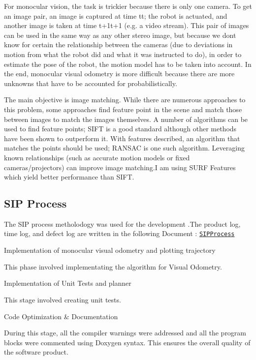 For monocular vision, the task is trickier because there is only one camera. To get an image pair, an image is captured at time tt; the robot is actuated, and another image is taken at time t+1t+1 (e.\+g. a video stream). This pair of images can be used in the same way as any other stereo image, but because we don\textquotesingle{}t know for certain the relationship between the cameras (due to deviations in motion from what the robot did and what it was instructed to do), in order to estimate the pose of the robot, the motion model has to be taken into account. In the end, monocular visual odometry is more difficult because there are more unknowns that have to be accounted for probabilistically.

The main objective is image matching. While there are numerous approaches to this problem, some approaches find feature point in the scene and match those between images to match the images themselves. A number of algorithms can be used to find feature points; S\+I\+FT is a good standard although other methods have been shown to outperform it. With features described, an algorithm that matches the points should be used; R\+A\+N\+S\+AC is one such algorithm. Leveraging known relationships (such as accurate motion models or fixed cameras/projectors) can improve image matching.\+I am using S\+U\+RF Features which yield better performance than S\+I\+FT.

\subsection*{S\+IP Process}

The S\+IP process metholodogy was used for the development .The product log, time log, and defect log are written in the following Document \+: \href{https://docs.google.com/spreadsheets/d/1RSP75a3Ezs6S3T3I84Ec1m85p-fogS6JML_CMYmCvE4/edit?usp=sharing}{\tt S\+I\+P\+Process}


\begin{DoxyEnumerate}
\item Implementation of monocular visual odometry and plotting trajectory
\begin{DoxyItemize}
\item This phase involved implementating the algorithm for Visual Odometry.
\end{DoxyItemize}
\item Implementation of Unit Tests and planner
\begin{DoxyItemize}
\item This stage involved creating unit tests.
\end{DoxyItemize}
\item Code Optimization \& Documentation
\begin{DoxyItemize}
\item During this stage, all the compiler warnings were addressed and all the program blocks were commented using Doxygen syntax. This ensures the overall quality of the software product.
\end{DoxyItemize}
\end{DoxyEnumerate}

